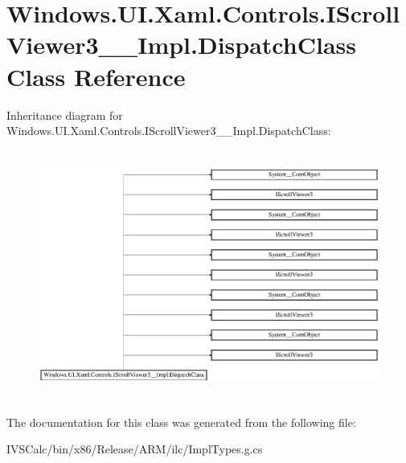 \hypertarget{class_windows_1_1_u_i_1_1_xaml_1_1_controls_1_1_i_scroll_viewer3_____impl_1_1_dispatch_class}{}\section{Windows.\+U\+I.\+Xaml.\+Controls.\+I\+Scroll\+Viewer3\+\_\+\+\_\+\+Impl.\+Dispatch\+Class Class Reference}
\label{class_windows_1_1_u_i_1_1_xaml_1_1_controls_1_1_i_scroll_viewer3_____impl_1_1_dispatch_class}
Inheritance diagram for Windows.\+U\+I.\+Xaml.\+Controls.\+I\+Scroll\+Viewer3\+\_\+\+\_\+\+Impl.\+Dispatch\+Class\+:\begin{figure}[H]
\begin{center}
\leavevmode
\includegraphics[height=8.213333cm]{class_windows_1_1_u_i_1_1_xaml_1_1_controls_1_1_i_scroll_viewer3_____impl_1_1_dispatch_class}
\end{center}
\end{figure}


The documentation for this class was generated from the following file\+:\begin{DoxyCompactItemize}
\item 
I\+V\+S\+Calc/bin/x86/\+Release/\+A\+R\+M/ilc/Impl\+Types.\+g.\+cs\end{DoxyCompactItemize}
